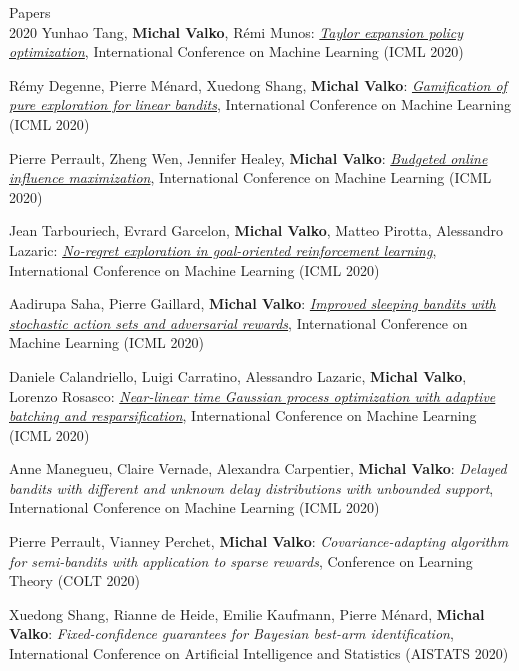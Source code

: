 \documentclass{resume}
\begin{document}
\begin{category}{Papers\\2020}
\citembullet
Yunhao Tang, {\bf Michal Valko}, R\' emi Munos:
\href{https://arxiv.org/pdf/1910.10945.pdf}
{\emph{Taylor expansion policy optimization}},
International Conference on Machine Learning
({\sf ICML 2020}) 

\citembullet
R\' emy Degenne, Pierre M\' enard, Xuedong Shang, {\bf Michal Valko}:
\href{https://arxiv.org/pdf/1910.10945.pdf}
{\emph{Gamification of pure exploration for linear bandits}},
International Conference on Machine Learning
({\sf ICML 2020}) 

\citembullet
Pierre Perrault, Zheng Wen, Jennifer Healey, {\bf Michal Valko}:
\href{https://hal.archives-ouvertes.fr/hal-02904278/document}
{\emph{Budgeted online influence maximization}},
International Conference on Machine Learning
({\sf ICML 2020}) 

\citembullet
Jean Tarbouriech, Evrard Garcelon, {\bf Michal Valko}, Matteo Pirotta, Alessandro Lazaric:
\href{https://arxiv.org/pdf/2003.06259.pdf}
{\emph{No-regret exploration in goal-oriented reinforcement learning}},
International Conference on Machine Learning
({\sf ICML 2020}) 

\citembullet
Aadirupa Saha, Pierre Gaillard, {\bf Michal Valko}:
\href{https://arxiv.org/abs/2004.06248}
{\emph{Improved sleeping bandits with stochastic action sets and adversarial rewards}},
International Conference on Machine Learning
({\sf ICML 2020}) 


\citembullet
Daniele Calandriello, Luigi Carratino, Alessandro Lazaric,  {\bf Michal Valko}, Lorenzo Rosasco:
\href{https://arxiv.org/pdf/2002.09954.pdf}
{\emph{Near-linear time Gaussian process optimization with adaptive batching and resparsification}},
International Conference on Machine Learning
({\sf ICML 2020}) 

\citembullet
Anne Manegueu, Claire Vernade, Alexandra Carpentier, {\bf Michal Valko}:
\emph{Delayed bandits with different and unknown delay distributions with unbounded support},
International Conference on Machine Learning
({\sf ICML 2020}) 

\citembullet
Pierre Perrault, Vianney Perchet,   {\bf Michal Valko}:
\emph{Covariance-adapting algorithm for semi-bandits with application to sparse rewards},
Conference on Learning Theory
({\sf COLT 2020}) 

\citembullet
Xuedong Shang, Rianne de Heide,  Emilie Kaufmann, Pierre M\'enard, {\bf Michal Valko}:
\emph{Fixed-confidence guarantees for Bayesian best-arm identification},
International Conference on Artificial Intelligence and Statistics
({\sf AISTATS 2020}) 


\end{category}
\end{document}
